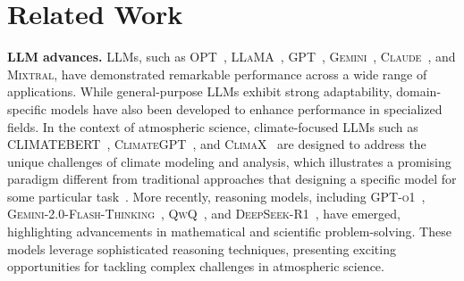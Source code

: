 \section{Related Work}
\textbf{LLM advances.}
LLMs, such as \textsc{OPT}~\cite{zhang2022opt}, \textsc{LLaMA}~\cite{touvron2023llama}, \textsc{GPT}~\cite{gpt4o}, \textsc{Gemini}~\cite{reid2024gemini}, \textsc{Claude}~\cite{claude3}, and \textsc{Mixtral}\cite{jiang2024mixtral}, have demonstrated remarkable performance across a wide range of applications. While general-purpose LLMs exhibit strong adaptability, domain-specific models have also been developed to enhance performance in specialized fields.
In the context of atmospheric science, climate-focused LLMs such as \textsc{CLIMATEBERT}~\cite{webersinke2021climatebert}, \textsc{ClimateGPT}~\cite{thulke2024climategpt}, and \textsc{ClimaX~\cite{nguyen2023climax}} are designed to address the unique challenges of climate modeling and analysis, which illustrates a promising paradigm different from traditional approaches that designing a specific model for some particular task~\cite{lam2022graphcast, pathak2022fourcastnet, bi2022pangu, chen2023fengwu, chen2023fuxi}.
More recently, reasoning models, including \textsc{GPT-o1}~\cite{openai_learning_to_reason_with_llms}, \textsc{Gemini-2.0-Flash-Thinking}~\cite{deepmind_gemini_flash_thinking}, \textsc{QwQ}~\cite{qwq-32b-preview}, and \textsc{DeepSeek-R1}~\cite{deepseekai2025deepseekr1incentivizingreasoningcapability}, have emerged, highlighting advancements in mathematical and scientific problem-solving. These models leverage sophisticated reasoning techniques, presenting exciting opportunities for tackling complex challenges in atmospheric science. %



